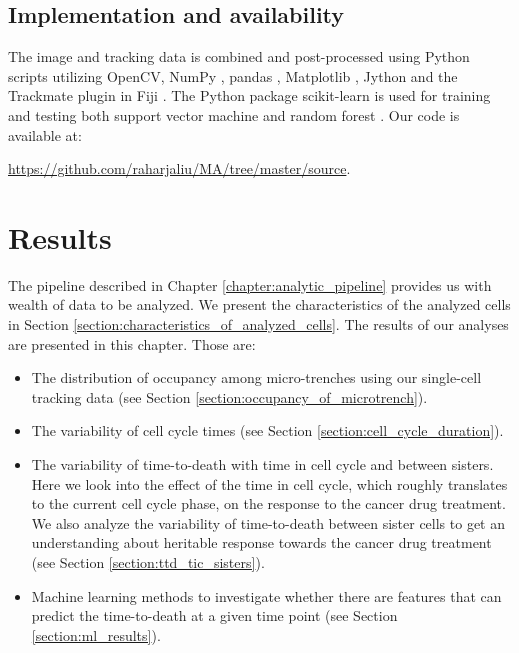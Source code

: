 \documentclass[pdftex,12pt,a4paper]{report}
\begin{document}
\section{Implementation and availability}

The image and tracking data is combined and post-processed using Python scripts utilizing OpenCV\cite{bradski2008learning}, NumPy \cite{walt2011numpy}, pandas \cite{mckinney2010data}, Matplotlib \cite{hunter2007matplotlib}, Jython and the Trackmate \cite{tinevez2017trackmate, pedroni2002jython} plugin in Fiji \cite{schindelin2012fiji}. The Python package scikit-learn is used for training and testing both support vector machine and random forest \cite{scikit-learn}. Our code is available at:

\href{https://github.com/raharjaliu/MA/tree/master/source}{https://github.com/raharjaliu/MA/tree/master/source}.

\chapter{Results}
\label{chapter:results}

The pipeline described in Chapter \ref{chapter:analytic_pipeline} provides us with wealth of data to be analyzed. We present the characteristics of the analyzed cells in Section \ref{section:characteristics_of_analyzed_cells}. The results of our analyses are presented in this chapter. Those are:

\begin{itemize}
\item The distribution of occupancy among micro-trenches using our single-cell tracking data (see Section \ref{section:occupancy_of_microtrench}).
\item The variability of cell cycle times (see Section \ref{section:cell_cycle_duration}).
\item The variability of time-to-death with time in cell cycle and between sisters.  Here we look into the effect of the time in cell cycle, which roughly translates to the current cell cycle phase, on the response to the cancer drug treatment. We also analyze the variability of time-to-death between sister cells to get an understanding about heritable response towards the cancer drug treatment  (see Section \ref{section:ttd_tic_sisters}).
\item Machine learning methods to investigate whether there are features that can predict the time-to-death at a given time point (see Section \ref{section:ml_results}).
\end{itemize}
\end{document}

